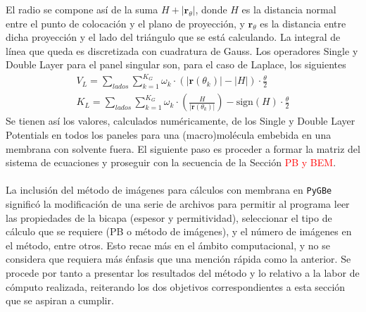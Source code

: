 \documentclass[12pt, oneside, numbers, spanish]{ezthesis}
\numberwithin{equation}{section}
\begin{document}
El radio se compone así de la suma $H + |\mathbf{r}_\theta|$, donde $H$ es la distancia normal entre el punto de colocación y el plano de proyección, y $\mathbf{r}_\theta$ es la distancia entre dicha proyección y el lado del triángulo que se está calculando. La integral de línea que queda es discretizada con cuadratura de Gauss. Los operadores Single y Double Layer para el panel singular son, para el caso de Laplace, los siguientes
\begin{gather}
V_L = \sum_{lados}\sum_{k=1}^{K_G}\omega_k\cdot (|\mathbf{r}(\theta_k)| - |H|)\cdot\frac{\theta}{2}\\
K_L = \sum_{lados}\sum_{k=1}^{K_G}\omega_k\cdot \left(\frac{H}{|\mathbf{r}(\theta_k)|}\right) - \text{sign}(H) \cdot\frac{\theta}{2}
\end{gather}
Se tienen así los valores, calculados numéricamente, de los Single y Double Layer Potentials en todos los paneles para una (macro)molécula embebida en una membrana con solvente fuera. El siguiente paso es proceder a formar la matriz del sistema de ecuaciones y proseguir con la secuencia de la Sección \textcolor{red}{PB y BEM}.\\\\
La inclusión del método de imágenes para cálculos con membrana en \texttt{PyGBe} significó la modificación de una serie de archivos para permitir al programa leer las propiedades de la bicapa (espesor y permitividad), seleccionar el tipo de cálculo que se requiere (PB o método de imágenes), y el número de imágenes en el método, entre otros. Esto recae más en el ámbito computacional, y no se considera que requiera más énfasis que una mención rápida como la anterior. Se procede por tanto a presentar los resultados del método y lo relativo a la labor de cómputo realizada, reiterando los dos objetivos correspondientes a esta sección que se aspiran a cumplir.
\end{document}
